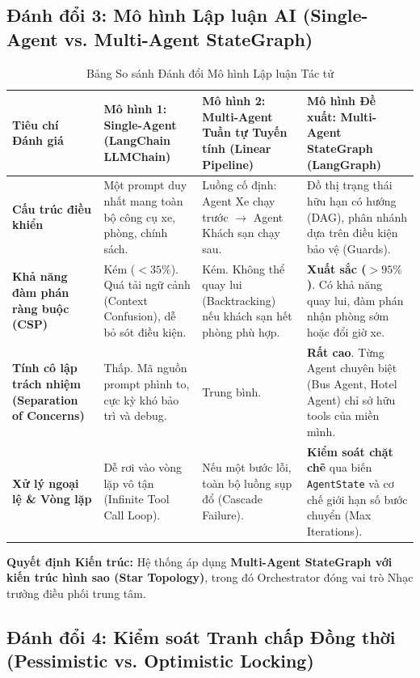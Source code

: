 \subsection{Đánh đổi 3: Mô hình Lập luận AI (Single-Agent vs. Multi-Agent StateGraph)}
\label{subsec:tradeoff_agent_architecture}

\begin{table}[h!]
\centering
\small
\begin{tabular}{|p{3.2cm}|p{3.8cm}|p{3.8cm}|p{4.2cm}|}
\hline
\textbf{Tiêu chí Đánh giá} & \textbf{Mô hình 1: Single-Agent (LangChain LLMChain)} & \textbf{Mô hình 2: Multi-Agent Tuần tự Tuyến tính (Linear Pipeline)} & \textbf{Mô hình Đề xuất: Multi-Agent StateGraph (LangGraph)} \\
\hline
\textbf{Cấu trúc điều khiển} & Một prompt duy nhất mang toàn bộ công cụ xe, phòng, chính sách. & Luồng cố định: Agent Xe chạy trước $\rightarrow$ Agent Khách sạn chạy sau. & Đồ thị trạng thái hữu hạn có hướng (DAG), phân nhánh dựa trên điều kiện bảo vệ (Guards). \\
\hline
\textbf{Khả năng đàm phán ràng buộc (CSP)} & Kém ($< 35\%$). Quá tải ngữ cảnh (Context Confusion), dễ bỏ sót điều kiện. & Kém. Không thể quay lui (Backtracking) nếu khách sạn hết phòng phù hợp. & \textbf{Xuất sắc ($> 95\%$)}. Có khả năng quay lui, đàm phán nhận phòng sớm hoặc đổi giờ xe. \\
\hline
\textbf{Tính cô lập trách nhiệm (Separation of Concerns)} & Thấp. Mã nguồn prompt phình to, cực kỳ khó bảo trì và debug. & Trung bình. & \textbf{Rất cao}. Từng Agent chuyên biệt (Bus Agent, Hotel Agent) chỉ sở hữu tools của miền mình. \\
\hline
\textbf{Xử lý ngoại lệ \& Vòng lặp} & Dễ rơi vào vòng lặp vô tận (Infinite Tool Call Loop). & Nếu một bước lỗi, toàn bộ luồng sụp đổ (Cascade Failure). & \textbf{Kiểm soát chặt chẽ} qua biến \texttt{AgentState} và cơ chế giới hạn số bước chuyển (Max Iterations). \\
\hline
\end{tabular}
\caption{Bảng So sánh Đánh đổi Mô hình Lập luận Tác tử}
\label{tab:tradeoff_agent_architecture}
\end{table}

\textbf{Quyết định Kiến trúc:} Hệ thống áp dụng \textbf{Multi-Agent StateGraph với kiến trúc hình sao (Star Topology)}, trong đó Orchestrator đóng vai trò Nhạc trưởng điều phối trung tâm.

\subsection{Đánh đổi 4: Kiểm soát Tranh chấp Đồng thời (Pessimistic vs. Optimistic Locking)}
\label{subsec:tradeoff_concurrency}

